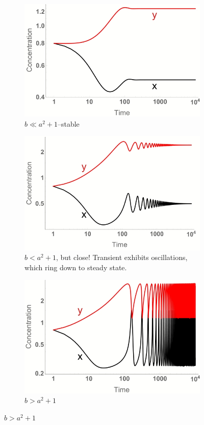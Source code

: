 \documentclass[]{article}
\begin{document}
{\begin{figure}[H]
	\begin{subfigure}[b]{0.3\textwidth}
		\centering
		\caption{ $b\ll a^2+1$--stable}\label{fig:BrusselatorSteadyState1} 
		\includegraphics[width=\textwidth]{BrusselatorSteadyState1}
	\end{subfigure}
	\begin{subfigure}[b]{0.3\textwidth}
		\centering
		\caption{$b<a^2+1$, but close! Transient exhibits oscillations, which ring down to steady state.}\label{fig:BrusselatorSteadyState2} 
		\includegraphics[width=\textwidth]{BrusselatorSteadyState2}
	\end{subfigure}
	\begin{subfigure}[b]{0.3\textwidth}
		\centering
		\caption{$b>a^2+1$}\label{fig:BrusselatorChaos} 
		\includegraphics[width=\textwidth]{BrusselatorChaos}

\end{subfigure}
\end{figure}}
\end{document}
